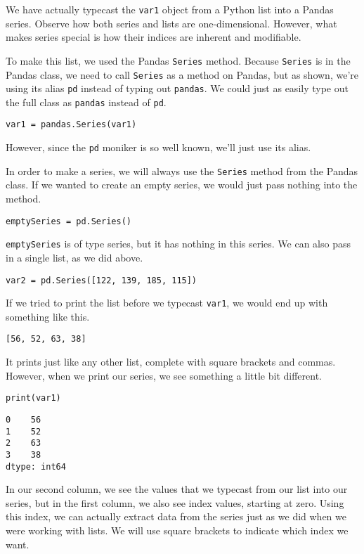 We have actually typecast the \verb|var1| object from a Python list into a Pandas series. Observe how both series and lists are one-dimensional. However, what makes series special is how their indices are inherent and modifiable.\par
To make this list, we used the Pandas \verb|Series| method. Because \verb|Series| is in the Pandas class, we need to call \verb|Series| as a method on Pandas, but as shown, we're using its alias \verb|pd| instead of typing out \verb|pandas|. We could just as easily type out the full class as \verb|pandas| instead of \verb|pd|.
\begin{lstlisting}[style=pippython]
var1 = pandas.Series(var1)
\end{lstlisting}
However, since the \verb|pd| moniker is so well known, we'll just use its alias.\par
In order to make a series, we will always use the \verb|Series| method from the Pandas class. If we wanted to create an empty series, we would just pass nothing into the method.
\begin{lstlisting}[style=pippython]
emptySeries = pd.Series()
\end{lstlisting}
\verb|emptySeries| is of type series, but it has nothing in this series. We can also pass in a single list, as we did above.
\begin{lstlisting}[style=pippython]
var2 = pd.Series([122, 139, 185, 115])
\end{lstlisting}\par
{}
If we tried to print the list before we typecast \verb|var1|, we would end up with something like this.
\begin{lstlisting}
[56, 52, 63, 38]
\end{lstlisting}
It prints just like any other list, complete with square brackets and commas. However, when we print our series, we see something a little bit different.
\begin{lstlisting}[style=pippython]
print(var1)
\end{lstlisting}
\begin{lstlisting}
0    56
1    52
2    63
3    38
dtype: int64
\end{lstlisting}
In our second column, we see the values that we typecast from our list into our series, but in the first column, we also see index values, starting at zero. Using this index, we can actually extract data from the series just as we did when we were working with lists. We will use square brackets to indicate which index we want.
